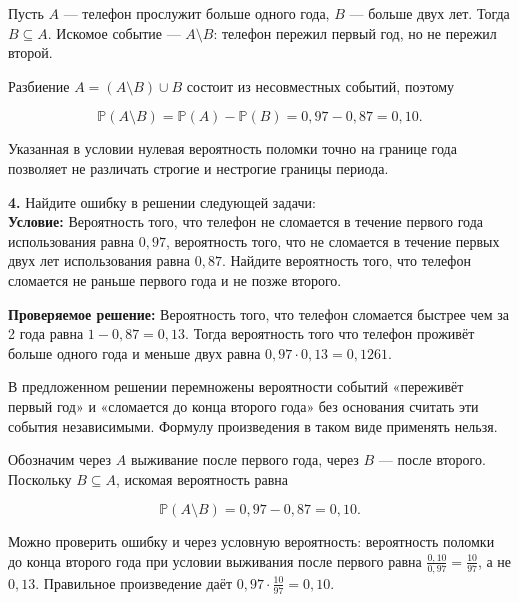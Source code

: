 \begin{solution}\label{solution-independent-events-homework-3}
Пусть $A$ — телефон прослужит больше одного года, $B$ — больше двух лет. Тогда $B\subseteq A$. Искомое событие — $A\setminus B$: телефон пережил первый год, но не пережил второй.

Разбиение $A=(A\setminus B)\cup B$ состоит из несовместных событий, поэтому

\[\mathbb P(A\setminus B)=\mathbb P(A)-\mathbb P(B)=0,97-0,87=0,10.\]

Указанная в условии нулевая вероятность поломки точно на границе года позволяет не различать строгие и нестрогие границы периода.
\end{solution}

\begin{task}\label{task-homework-4}
\textbf{4.} Найдите ошибку в решении следующей задачи:\\
 \textbf{Условие:} Вероятность того, что телефон не сломается в течение первого года использования равна $0,97$, вероятность того, что не сломается в течение первых двух лет использования равна $0,87$. Найдите вероятность того, что телефон сломается не раньше первого года и не позже второго.\\
 

\begin{given}\label{given-solution-independent-events-homework-4}
\textbf{Проверяемое решение:} Вероятность того, что телефон сломается быстрее чем за 2 года равна $1 - 0,87 = 0,13$. Тогда вероятность того что телефон проживёт больше одного года и меньше двух равна $0,97\cdot 0,13 = 0,1261$.
\end{given}
\end{task}

\begin{solution}\label{solution-independent-events-homework-4}
В предложенном решении перемножены вероятности событий «переживёт первый год» и «сломается до конца второго года» без основания считать эти события независимыми. Формулу произведения в таком виде применять нельзя.

Обозначим через $A$ выживание после первого года, через $B$ — после второго. Поскольку $B\subseteq A$, искомая вероятность равна

\[\mathbb P(A\setminus B)=0,97-0,87=0,10.\]

Можно проверить ошибку и через условную вероятность: вероятность поломки до конца второго года при условии выживания после первого равна $\frac{0,10}{0,97}=\frac{10}{97}$, а не $0,13$. Правильное произведение даёт $0,97\cdot\frac{10}{97}=0,10$.
\end{solution}

